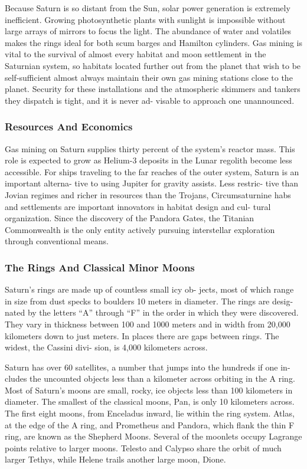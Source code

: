 Because Saturn is so distant from the Sun, solar 
power generation is extremely inefficient. Growing 
photosynthetic plants with sunlight is impossible 
without large arrays of mirrors to focus the light. The 
abundance of water and volatiles makes the rings 
ideal for both scum barges and Hamilton cylinders. 
Gas mining is vital to the survival of almost every 
habitat and moon settlement in the Saturnian system, 
so habitats located further out from the planet that 
wish to be self-sufficient almost always maintain their 
own gas mining stations close to the planet. Security 
for these installations and the atmospheric skimmers 
and tankers they dispatch is tight, and it is never ad-
visable to approach one unannounced.

\subsubsection{Resources And Economics}

Gas mining on Saturn supplies thirty percent of the 
system's reactor mass. This role is expected to grow 
as Helium-3 deposits in the Lunar regolith become 
less accessible. For ships traveling to the far reaches 
of the outer system, Saturn is an important alterna-
tive to using Jupiter for gravity assists. Less restric-
tive than Jovian regimes and richer in resources than 
the Trojans, Circumsaturnine habs and settlements 
are important innovators in habitat design and cul-
tural organization. Since the discovery of the Pandora 
Gates, the Titanian Commonwealth is the only entity 
actively pursuing interstellar exploration through 
conventional means.

\subsubsection{The Rings And Classical Minor Moons}

Saturn's rings are made up of countless small icy ob-
jects, most of which range in size from dust specks to 
boulders 10 meters in diameter. The rings are desig-
nated by the letters ``A'' through ``F'' in the order in 
which they were discovered. They vary in thickness 
between 100 and 1000 meters and in width from 
20,000 kilometers down to just meters. In places there 
are gaps between rings. The widest, the Cassini divi-
sion, is 4,000 kilometers across.

Saturn has over 60 satellites, a number 
that jumps into the hundreds if one in-
cludes the uncounted objects less than a 
kilometer across orbiting in the A ring. 
Most of Saturn's moons are small, rocky, 
ice objects less than 100 kilometers in 
diameter. The smallest of the classical 
moons, Pan, is only 10 kilometers across. 
The first eight moons, from Enceladus 
inward, lie within the ring system. Atlas, 
at the edge of the A ring, and Prometheus 
and Pandora, which flank the thin F 
ring, are known as the Shepherd Moons. 
Several of the moonlets occupy Lagrange 
points relative to larger moons. Telesto 
and Calypso share the orbit of much 
larger Tethys, while Helene trails another 
large moon, Dione.

